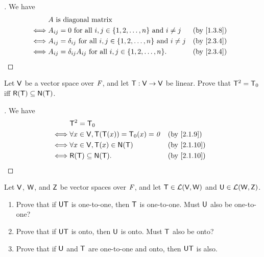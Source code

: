 \begin{proof}[]
  We have
  \begin{align*}
         & A \text{ is diagonal matrix}                                                                                              \\
    \iff & A_{i j} = 0 \text{ for all } i, j \in \set{1, 2, \dots, n} \text{ and } i \neq j            &  & \text{(by \cref{1.3.8})} \\
    \iff & A_{i j} = \delta_{i j} \text{ for all } i, j \in \set{1, 2, \dots, n} \text{ and } i \neq j &  & \text{(by \cref{2.3.4})} \\
    \iff & A_{i j} = \delta_{i j} A_{i j} \text{ for all } i, j \in \set{1, 2, \dots, n}.              &  & \text{(by \cref{2.3.4})}
  \end{align*}
\end{proof}

\begin{ex}\label{ex:2.3.11}
  Let \(\mathsf{V}\) be a vector space over \(\mathit{F}\), and let \(\mathsf{T} : \mathsf{V} \to \mathsf{V}\) be linear.
  Prove that \(\mathsf{T}^2 = \mathsf{T}_0\) iff \(\rg{\T} \subseteq \ns{\T}\).
\end{ex}

\begin{proof}[]
  We have
  \begin{align*}
         & \T^2 = \zT                                                                \\
    \iff & \forall x \in \V, \T(\T(x)) = \zT(x) = \zv &  & \text{(by \cref{2.1.9})}  \\
    \iff & \forall x \in \V, \T(x) \in \ns{\T}        &  & \text{(by \cref{2.1.10})} \\
    \iff & \rg{\T} \subseteq \ns{\T}.                 &  & \text{(by \cref{2.1.10})}
  \end{align*}
\end{proof}

\begin{ex}\label{ex:2.3.12}
  Let \(\mathsf{V}\), \(\mathsf{W}\), and \(\mathsf{Z}\) be vector spaces over \(\mathit{F}\), and let \(\mathsf{T} \in \mathcal{L}(\mathsf{V}, \mathsf{W})\) and \(\mathsf{U} \in \mathcal{L}(\mathsf{W}, \mathsf{Z})\).
  \begin{enumerate}
    \item Prove that if \(\mathsf{U} \mathsf{T}\) is one-to-one, then \(\mathsf{T}\) is one-to-one.
          Must \(\mathsf{U}\) also be one-to-one?
    \item Prove that if \(\mathsf{U} \mathsf{T}\) is onto, then \(\mathsf{U}\) is onto.
          Must \(\mathsf{T}\) also be onto?
    \item Prove that if \(\mathsf{U}\) and \(\mathsf{T}\) are one-to-one and onto, then \(\mathsf{U} \mathsf{T}\) is also.
  \end{enumerate}
\end{ex}

